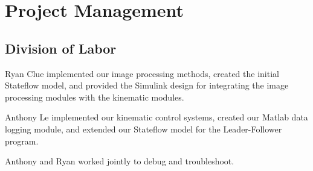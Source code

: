 \chapter{Project Management}


\section{Division of Labor}
Ryan Clue implemented our image processing methods, created the initial Stateflow model, and provided the Simulink design for integrating the image processing modules with the kinematic modules.

Anthony Le implemented our kinematic control systems, created our Matlab data logging module, and extended our Stateflow model for the Leader-Follower program.

Anthony and Ryan worked jointly to debug and troubleshoot.